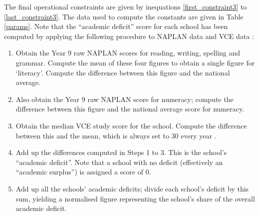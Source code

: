 \documentclass[11pt, a4paper]{article}
\begin{document}
    The final operational constraints are given by inequations \ref{first_constraint3} to \ref{last_constraint3}. The data used to compute the constants are given in Table \ref{params}. Note that the ``academic deficit'' score for each school has been computed by applying the following procedure to NAPLAN data \parencite{naplan} and VCE data \parencite{vce_scores}:

    \begin{enumerate}
        \item Obtain the Year 9 raw NAPLAN scores for reading, writing, spelling and grammar. Compute the mean of these four figures to obtain a single figure for `literacy'. Compute the difference between this figure and the national average. 
        \item Also obtain the Year 9 raw NAPLAN score for numeracy; compute the difference between this figure and the national average score for numeracy.
        \item Obtain the median VCE study score for the school. Compute the difference between this and the mean, which is always set to 30 every year \parencite{vce_info}.
        \item Add up the differences computed in Steps 1 to 3. This is the school's ``academic deficit''. Note that a school with no deficit (effectively an ``academic surplus'') is assigned a score of 0.
        \item Add up all the schools' academic deficits; divide each school's deficit by this sum, yielding a normalised figure representing the school's share of the overall academic deficit.
    \end{enumerate}
\end{document}
